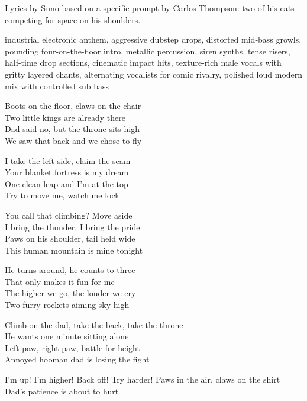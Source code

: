 
\begin{notes}
Lyrics by Suno based on a specific prompt by Carlos Thompson: two of his cats competing for space on his shoulders.
\end{notes}
\begin{style}
industrial electronic anthem, aggressive dubstep drops, distorted mid-bass growls, pounding four-on-the-floor intro, metallic percussion, siren synths, tense risers, half-time drop sections, cinematic impact hits, texture-rich male vocals with gritty layered chants, alternating vocalists for comic rivalry, polished loud modern mix with controlled sub bass
\end{style}
\begin{lyrics}
Boots on the floor, claws on the chair\\
Two little kings are already there\\
Dad said no, but the throne sits high\\
We saw that back and we chose to fly

I take the left side, claim the seam\\
Your blanket fortress is my dream\\
One clean leap and I’m at the top\\
Try to move me, watch me lock

You call that climbing? Move aside\\
I bring the thunder, I bring the pride\\
Paws on his shoulder, tail held wide\\
This human mountain is mine tonight

He turns around, he counts to three\\
That only makes it fun for me\\
The higher we go, the louder we cry\\
Two furry rockets aiming sky-high

Climb on the dad, take the back, take the throne\\
He wants one minute sitting alone\\
Left paw, right paw, battle for height\\
Annoyed hooman dad is losing the fight

 I’m up!
 I’m higher!
 Back off!
 Try harder!
 Paws in the air, claws on the shirt\\
Dad’s patience is about to hurt


\end{lyrics}
